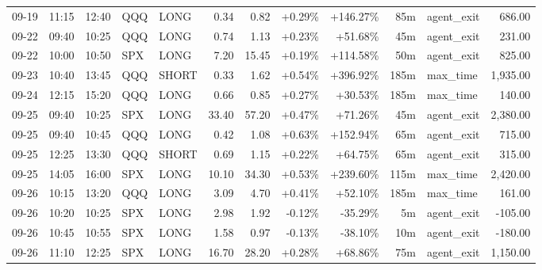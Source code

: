 \documentclass[11pt,a4paper,twoside]{article}
\begin{document}
\begin{center}
\begin{longtable}{>{\color{txtmain}}l l l l l r r r r r >{\color{txtmain}}l r}
09-19 & 11:15 & 12:40 & QQQ & LONG & 0.34 & 0.82 & \textcolor{wingreen}{+0.29\%} & \textcolor{wingreen}{+146.27\%} & 85m & agent\_exit & \textcolor{wingreen}{686.00} \\
09-22 & 09:40 & 10:25 & QQQ & LONG & 0.74 & 1.13 & \textcolor{wingreen}{+0.23\%} & \textcolor{wingreen}{+51.68\%} & 45m & agent\_exit & \textcolor{wingreen}{231.00} \\
09-22 & 10:00 & 10:50 & SPX & LONG & 7.20 & 15.45 & \textcolor{wingreen}{+0.19\%} & \textcolor{wingreen}{+114.58\%} & 50m & agent\_exit & \textcolor{wingreen}{825.00} \\
09-23 & 10:40 & 13:45 & QQQ & SHORT & 0.33 & 1.62 & \textcolor{wingreen}{+0.54\%} & \textcolor{wingreen}{+396.92\%} & 185m & max\_time & \textcolor{wingreen}{1,935.00} \\
09-24 & 12:15 & 15:20 & QQQ & LONG & 0.66 & 0.85 & \textcolor{wingreen}{+0.27\%} & \textcolor{wingreen}{+30.53\%} & 185m & max\_time & \textcolor{wingreen}{140.00} \\
09-25 & 09:40 & 10:25 & SPX & LONG & 33.40 & 57.20 & \textcolor{wingreen}{+0.47\%} & \textcolor{wingreen}{+71.26\%} & 45m & agent\_exit & \textcolor{wingreen}{2,380.00} \\
09-25 & 09:40 & 10:45 & QQQ & LONG & 0.42 & 1.08 & \textcolor{wingreen}{+0.63\%} & \textcolor{wingreen}{+152.94\%} & 65m & agent\_exit & \textcolor{wingreen}{715.00} \\
09-25 & 12:25 & 13:30 & QQQ & SHORT & 0.69 & 1.15 & \textcolor{wingreen}{+0.22\%} & \textcolor{wingreen}{+64.75\%} & 65m & agent\_exit & \textcolor{wingreen}{315.00} \\
09-25 & 14:05 & 16:00 & SPX & LONG & 10.10 & 34.30 & \textcolor{wingreen}{+0.53\%} & \textcolor{wingreen}{+239.60\%} & 115m & max\_time & \textcolor{wingreen}{2,420.00} \\
09-26 & 10:15 & 13:20 & QQQ & LONG & 3.09 & 4.70 & \textcolor{wingreen}{+0.41\%} & \textcolor{wingreen}{+52.10\%} & 185m & max\_time & \textcolor{wingreen}{161.00} \\
09-26 & 10:20 & 10:25 & SPX & LONG & 2.98 & 1.92 & \textcolor{lossred}{-0.12\%} & \textcolor{lossred}{-35.29\%} & 5m & agent\_exit & \textcolor{lossred}{-105.00} \\
09-26 & 10:45 & 10:55 & SPX & LONG & 1.58 & 0.97 & \textcolor{lossred}{-0.13\%} & \textcolor{lossred}{-38.10\%} & 10m & agent\_exit & \textcolor{lossred}{-180.00} \\
09-26 & 11:10 & 12:25 & SPX & LONG & 16.70 & 28.20 & \textcolor{wingreen}{+0.28\%} & \textcolor{wingreen}{+68.86\%} & 75m & agent\_exit & \textcolor{wingreen}{1,150.00} \\

\end{longtable}
\end{center}
\end{document}
